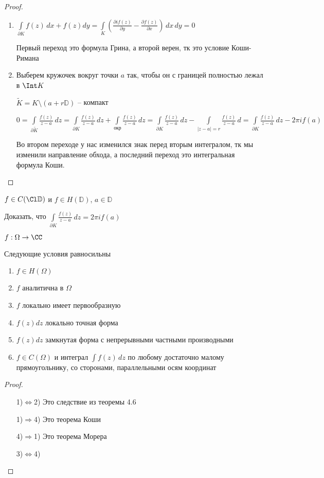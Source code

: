 \begin{proof}\thmslashn
		
	\begin{enumerate}
		\item 
		$\int\limits_{\partial K} f(z)\,dx + f(z)dy = \int\limits_{K}\left( \frac{\partial if(z)}{\partial y} - \frac{\partial f(z)}{\partial x} \right)\,dx\,dy = 0$
		
		Первый переход это формула Грина, а второй верен, тк это условие Коши-Римана 
		
		\item
		Выберем кружочек вокруг точки $a$ так, чтобы он с границей полностью лежал в $\Int K$
		
		$\tilde{K} = K \setminus(a + r\mathbb{D})$ -- компакт
		
		$0 = \int\limits_{\partial \tilde{K}} \frac{f(z)}{z-a}\,dz = \int\limits_{\partial K} \frac{f(z)}{z-a}\,dz + \int\limits_{\text{окр}} \frac{f(z)}{z-a}\,dz =  \int\limits_{\partial K} \frac{f(z)}{z-a}\,dz - \int\limits_{|z-a| = r} \frac{f(z)}{z-a}\,d = \int\limits_{\partial K} \frac{f(z)}{z-a}\,dz - 2\pi i f(a)$
		
		Во втором переходе у нас изменился знак перед вторым интегралом, тк мы изменили направление обхода, а последний переход это интегральная формула Коши.
	\end{enumerate}
	
\end{proof}

\begin{exerc}
	$f\in C(\Cl \mathbb{D})$ и $f \in H(\mathbb{D})$, $a \in \mathbb{D}$
	
	Доказать, что $\int\limits_{\partial K} \frac{f(z)}{z-a}\,dz = 2\pi i f(a)$
\end{exerc}

\begin{theorem}\thmslashn
	
	$f:\Omega \to \CC$ 
	
	Следующие условия равносильны
	
	\begin{enumerate}[1)]
		\item 
		$f\in H(\Omega)$
		\item
		$f$ аналитична в $\Omega$
		\item
		$f$ локально имеет первообразную
		\item
		$f(z)dz$ локально точная форма
		\item
		$f(z)dz$ замкнутая форма с непрерывными частными производными 
		\item
		$f\in C(\Omega)$ и интеграл $\int f(z)\,dz$ по любому достаточно малому прямоугольнику, со сторонами, параллельными осям координат
		 
	\end{enumerate}
	
\end{theorem}

\begin{proof}\thmslashn
	\begin{enumerate}
		\item[1)$\Leftrightarrow$2)]
		Это следствие из теоремы 4.6
		\item[1)$\Rightarrow$4)]
		Это теорема Коши
		\item[4)$\Rightarrow$1)]
		Это теорема Морера
		\item[3)$\Leftrightarrow$4)]
		
	\end{enumerate}
	
\end{proof}